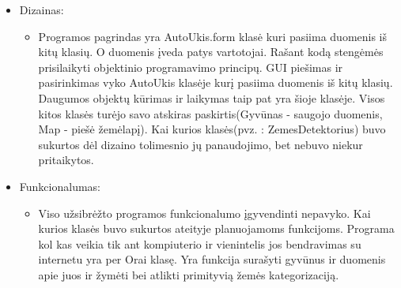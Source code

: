 \documentclass[oneside]{VUMIFPSkursinis}
\begin{document}
	\begin{itemize}
		\item Dizainas: 
		\begin{itemize}
			\item Programos pagrindas yra AutoUkis.form klasė kuri pasiima duomenis iš kitų klasių. O duomenis įveda patys vartotojai. Rašant kodą stengėmės prisilaikyti objektinio programavimo principų. GUI piešimas ir pasirinkimas vyko AutoUkis klasėje kurį pasiima duomenis iš kitų klasių. Daugumos objektų kūrimas ir laikymas taip pat yra šioje klasėje. Visos kitos klasės turėjo savo atskiras paskirtis(Gyvūnas - saugojo duomenis, Map - piešė žemėlapį). Kai kurios klasės(pvz. : ZemesDetektorius) buvo sukurtos dėl dizaino tolimesnio jų panaudojimo, bet nebuvo niekur pritaikytos.
		\end{itemize}
		\item Funkcionalumas:
		\begin{itemize}
		\item Viso užsibrėžto programos funkcionalumo įgyvendinti nepavyko. Kai kurios klasės buvo sukurtos ateityje planuojamoms funkcijoms. Programa kol kas veikia tik ant kompiuterio ir vienintelis jos bendravimas su internetu yra per Orai klasę. Yra funkcija surašyti gyvūnus ir duomenis apie juos ir žymėti bei atlikti primityvią žemės kategorizaciją.
		\end{itemize}	
	\end{itemize}
 
\end{document}
